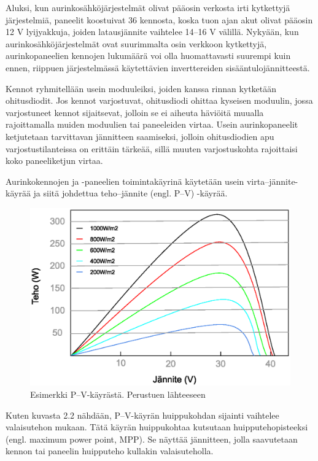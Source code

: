   Aluksi, kun aurinkosähköjärjestelmät olivat pääosin verkosta irti kytkettyjä järjestelmiä, paneelit koostuivat 36 kennosta, koska tuon ajan akut olivat pääosin 12 V lyijyakkuja, joiden latausjännite vaihtelee 14–16 V välillä. Nykyään, kun aurinkosähköjärjestelmät ovat suurimmalta osin verkkoon kytkettyjä, aurinkopaneelien kennojen lukumäärä voi olla huomattavasti suurempi kuin ennen, riippuen järjestelmässä käytettävien inverttereiden sisääntulojännitteestä. \parencite{Messenger}

  Kennot ryhmitellään usein moduuleiksi, joiden kanssa rinnan kytketään ohitusdiodit. Jos kennot varjostuvat, ohitusdiodi ohittaa kyseisen moduulin, jossa varjostuneet kennot sijaitsevat, jolloin se ei aiheuta häviöitä muualla rajoittamalla muiden moduulien tai paneeleiden virtaa. Usein aurinkopaneelit ketjutetaan tarvittavan jännitteen saamiseksi, jolloin ohitusdiodien apu varjostustilanteissa on erittäin tärkeää, sillä muuten varjostuskohta rajoittaisi koko paneeliketjun virtaa. \parencite{Willeke&Weber}

  Aurinkokennojen ja -paneelien toimintakäyrinä käytetään usein virta--jännite-käyrää ja siitä johdettua teho--jännite (engl. P--V) -käyrää. \begin{figure}[h]
    \centering
    \includegraphics[width=\textwidth]{figures/pvcurve}
    \caption[Esimerkki P--V-käyrästä]{Esimerkki P--V-käyrästä. Perustuen lähteeseen \parencite{JASolar}}
  \end{figure} Kuten kuvasta 2.2 nähdään, P--V-käyrän huippukohdan sijainti vaihtelee valaisutehon mukaan. Tätä käyrän huippukohtaa kutsutaan huipputehopisteeksi (engl. maximum power point, MPP). Se näyttää jännitteen, jolla saavutetaan kennon tai paneelin huipputeho kullakin valaisuteholla.


